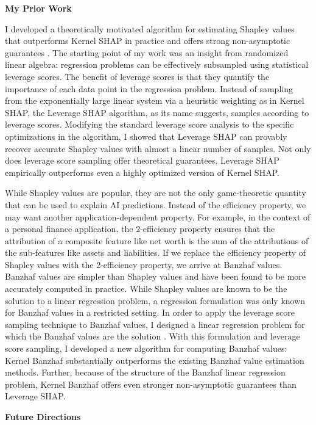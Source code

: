 \documentclass[11pt]{article}
\begin{document}
{{ \large \textbf{My Prior Work}}

I developed a theoretically motivated algorithm for estimating Shapley values that outperforms Kernel SHAP in practice and offers strong non-asymptotic guarantees \cite{musco2024leverage}.
The starting point of my work was an insight from randomized linear algebra: regression problems can be effectively subsampled using statistical leverage scores.
The benefit of leverage scores is that they quantify the importance of each data point in the regression problem.
Instead of sampling from the exponentially large linear system via a heuristic weighting as in Kernel SHAP, the Leverage SHAP algorithm, as its name suggests, samples according to leverage scores.
Modifying the standard leverage score analysis to the specific optimizations in the algorithm, I showed that Leverage SHAP can provably recover accurate Shapley values with almost a linear number of samples.
Not only does leverage score sampling offer theoretical guarantees, Leverage SHAP empirically outperforms even a highly optimized version of Kernel SHAP.

While Shapley values are popular, they are not the only game-theoretic quantity that can be used to explain AI predictions.
Instead of the efficiency property, we may want another application-dependent property.
For example, in the context of a personal finance application, the 2-efficiency property ensures that the attribution of a composite feature like net worth is the sum of the attributions of the sub-features like assets and liabilities.
If we replace the efficiency property of Shapley values with the 2-efficiency property, we arrive at Banzhaf values.
Banzhaf values are simpler than Shapley values and have been found to be more accurately computed in practice.
While Shapley values are known to be the solution to a linear regression problem, a regression formulation was only known for Banzhaf values in a restricted setting.
In order to apply the leverage score sampling technique to Banzhaf values, I designed a linear regression problem for which the Banzhaf values are the solution \cite{liu2024kernel}.
With this formulation and leverage score sampling, I developed a new algorithm for computing Banzhaf values:
Kernel Banzhaf substantially outperforms the existing Banzhaf value estimation methods.
Further, because of the structure of the Banzhaf linear regression problem, Kernel Banzhaf offers even stronger non-asymptotic guarantees than Leverage SHAP.

{ \large \textbf{Future Directions}}

}
\end{document}
